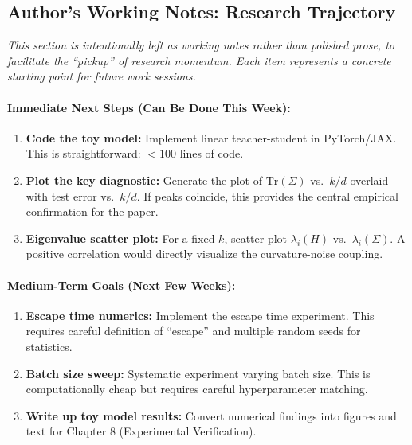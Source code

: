 \documentclass[
  journal=largetwo,
  year=2025,
  volume=37,
]{cup-journal}
\begin{document}
\subsection{Author's Working Notes: Research Trajectory}\label{app:author_notes}

\textit{This section is intentionally left as working notes rather than polished prose, to facilitate the ``pickup'' of research momentum. Each item represents a concrete starting point for future work sessions.}

\paragraph{Immediate Next Steps (Can Be Done This Week):}
\begin{enumerate}
    \item \textbf{Code the toy model:} Implement linear teacher-student in PyTorch/JAX. This is straightforward: $<100$ lines of code.
    \item \textbf{Plot the key diagnostic:} Generate the plot of $\text{Tr}(\Sigma)$ vs.\ $k/d$ overlaid with test error vs.\ $k/d$. If peaks coincide, this provides the central empirical confirmation for the paper.
    \item \textbf{Eigenvalue scatter plot:} For a fixed $k$, scatter plot $\lambda_i(H)$ vs.\ $\lambda_i(\Sigma)$. A positive correlation would directly visualize the curvature-noise coupling.
\end{enumerate}

\paragraph{Medium-Term Goals (Next Few Weeks):}
\begin{enumerate}
    \item \textbf{Escape time numerics:} Implement the escape time experiment. This requires careful definition of ``escape'' and multiple random seeds for statistics.
    \item \textbf{Batch size sweep:} Systematic experiment varying batch size. This is computationally cheap but requires careful hyperparameter matching.
    \item \textbf{Write up toy model results:} Convert numerical findings into figures and text for Chapter 8 (Experimental Verification).
\end{enumerate}
\end{document}
